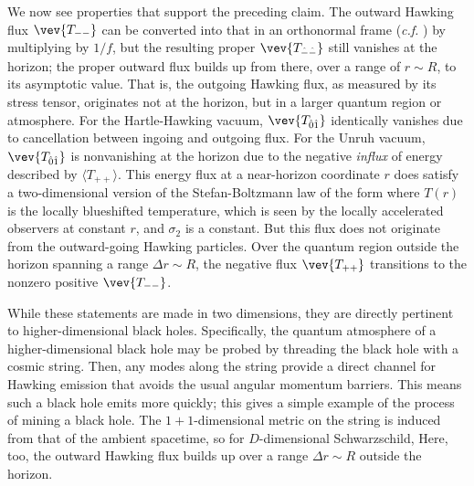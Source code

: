 We now see properties that support the preceding claim.  The outward Hawking flux $\vev{T_{--}}$ can be converted into that in an orthonormal frame ({\it c.f.} \tdmet) by multiplying by $1/f$, but the resulting proper $\vev{T_{\hat -\hat -}}$ still vanishes at the horizon; the proper outward flux builds up from there, over a range of $r\sim R$, to its asymptotic value.
That is, the outgoing Hawking flux, as measured by its stress tensor, originates not at the horizon, but in a larger quantum region or atmosphere.  
For the Hartle-Hawking vacuum, $\vev{T_{\hat0\hat1}}$ identically vanishes due to cancellation between ingoing and outgoing flux. 
For the Unruh vacuum, $\vev{T_{\hat0\hat1}}$ is nonvanishing at the horizon  due to the negative {\it influx}    of energy described by $\langle T_{++}\rangle$.  This energy flux at a near-horizon coordinate $r$ does satisfy a two-dimensional version of the Stefan-Boltzmann law of the form
%
\eqn{}
%
 where $T(r)$ is the locally blueshifted temperature, which is seen by the locally accelerated observers at constant $r$, and $\sigma_2$ is a constant.  But this flux does not originate from the outward-going Hawking particles.   Over the quantum region outside the horizon spanning a range $\Delta r\sim R$, the negative flux $\vev{T_{++}}$ transitions to the nonzero positive $\vev{T_{--}}$.  

While these statements are made in two dimensions, they are directly pertinent to higher-dimensional black holes.  Specifically, the quantum atmosphere of a higher-dimensional black hole may be probed by threading the black hole with a cosmic string.  Then, any modes along the string provide a direct channel for Hawking emission that avoids the usual angular momentum barriers.  This means such a black hole emits more quickly; this gives a simple example of the process of mining a black hole.  The $1+1$-dimensional metric on the string is induced from that of the ambient spacetime, so for $D$-dimensional Schwarzschild,
%
\eqn{}
%
Here, too, the outward Hawking flux builds up over a range  $\Delta r\sim R$ outside the horizon.

